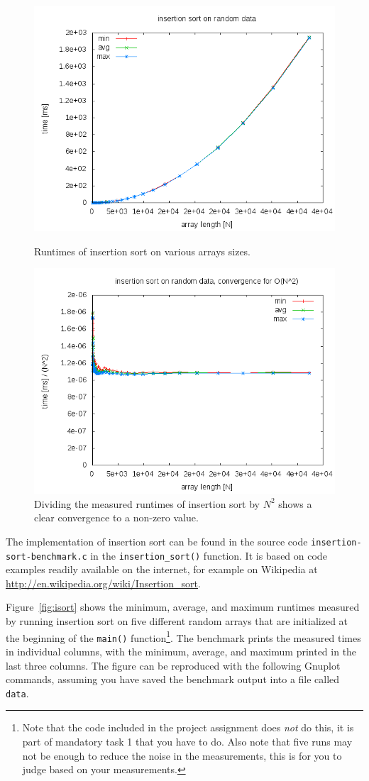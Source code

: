 \documentclass[a4paper,10pt]{article}
\begin{document}
\begin{figure}
  \centering
  \includegraphics[width=0.7\columnwidth]{examples/isort-example.png}
  \caption{
    Runtimes of insertion sort on various arrays sizes.
  }\label{fig:isort}
  \vspace{\baselineskip}
  \includegraphics[width=0.7\columnwidth]{examples/isort-example-N2.png}
  \caption{
    Dividing the measured runtimes of insertion sort by $N^2$ shows a clear convergence to a non-zero value.
  }\label{fig:isort-N2}
\end{figure}

The implementation of insertion sort can be found in the source code \texttt{insertion\--sort\--benchmark.c} in the \texttt{insertion\_sort()} function.
It is based on code examples readily available on the internet, for example on Wikipedia at \url{http://en.wikipedia.org/wiki/Insertion_sort}.

Figure~\ref{fig:isort} shows the minimum, average, and maximum runtimes measured by running insertion sort on five different random arrays that are initialized at the beginning of the \texttt{main()} function\footnote{
  Note that the code included in the project assignment does \emph{not} do this, it is part of mandatory task 1 that you have to do.
  Also note that five runs may not be enough to reduce the noise in the measurements, this is for you to judge based on your measurements.
}.
The benchmark prints the measured times in individual columns, with the minimum, average, and maximum printed in the last three columns.
The figure can be reproduced with the following Gnuplot commands, assuming you have saved the benchmark output into a file called \texttt{data}.
\end{document}
